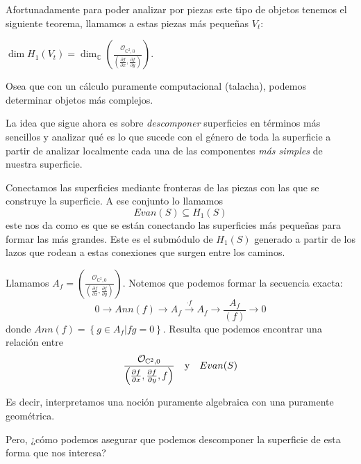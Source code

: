 \documentclass[12pt]{report}
\newcounter{it}
\theoremstyle{largebreak}
\begin{document}
    Afortunadamente para poder analizar por piezas este tipo de objetos tenemos el siguiente teorema, llamamos a estas piezas más pequeñas $V_t$:

    \begin{theor}
        $\dim H_1(V_t)=\dim_{\mathbb{C}}\left(\frac{\mathcal{O}_{\mathbb{C}^2,0}}{\left(\frac{\partial f}{\partial x},\frac{\partial f}{\partial y}\right)}\right)$.
    \end{theor}

    Osea que con un cálculo puramente computacional (talacha), podemos determinar objetos más complejos.

    La idea que sigue ahora es sobre \textit{descomponer} superficies en términos más sencillos y analizar qué es lo que sucede con el género de toda la superficie a partir de analizar localmente cada una de las componentes \textit{más simples} de nuestra superficie.

    Conectamos las superficies mediante fronteras de las piezas con las que se construye la superficie. A ese conjunto lo llamamos
    \begin{equation*}
        Evan(S)\subseteq H_1(S)
    \end{equation*}
    este nos da como es que se están conectando las superficies más pequeñas para formar las más grandes. Este es el submódulo de $H_1(S)$ generado a partir de los lazos que rodean a estas conexiones que surgen entre los caminos.

    Llamamos $A_f=\left(\frac{\mathcal{O}_{\mathbb{C}^2,0}}{\left(\frac{\partial f}{\partial x},\frac{\partial f}{\partial y}\right)}\right)$. Notemos que podemos formar la secuencia exacta:
    \begin{equation*}
        0\rightarrow Ann(f)\rightarrow A_f\overset{\cdot f}{\rightarrow} A_f\rightarrow\frac{A_f}{(f)}\rightarrow0
    \end{equation*}
    donde $Ann(f)=\left\{g\in A_f\Big|fg=0 \right\}$. Resulta que podemos encontrar una relación entre
    \begin{equation*}
        \frac{\mathcal{O}_{\mathbb{C}^2,0}}{\left(\frac{\partial f}{\partial x},\frac{\partial f}{\partial y},f\right)}\quad\textup{y}\quad Evan(S)
    \end{equation*}

    Es decir, interpretamos una noción puramente algebraica con una puramente geométrica.

    Pero, ¿cómo podemos asegurar que podemos descomponer la superficie de esta forma que nos interesa?
\end{document}

